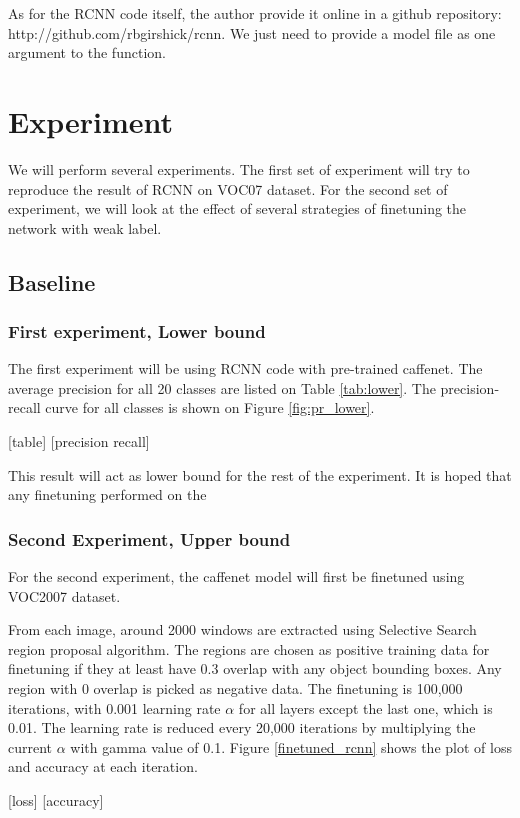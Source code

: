 \documentclass[a4paper,11pt]{kth-mag}
\begin{document}
As for the RCNN code itself, the author provide it online in a github repository: http://github.com/rbgirshick/rcnn. We just need to provide a model file as one argument to the function.

\section{Experiment}
We will perform several experiments. The first set of experiment will try to reproduce the result of RCNN on VOC07 dataset. For the second set of experiment, we will look at the effect of several strategies of finetuning the network with weak label.

\subsection{Baseline}
\subsubsection{First experiment, Lower bound}
The first experiment will be using RCNN code with pre-trained caffenet. The average precision for all 20 classes are listed on Table \ref{tab:lower}. The precision-recall curve for all classes is shown on Figure \ref{fig:pr_lower}.

[table]
[precision recall]

This result will act as lower bound for the rest of the experiment. It is hoped that any finetuning performed on the 

\subsubsection{Second Experiment, Upper bound}
For the second experiment, the caffenet model will first be finetuned using VOC2007 dataset.

From each image, around 2000 windows are extracted using Selective Search region proposal algorithm. The regions are chosen as positive training data for finetuning if they at least have 0.3 overlap with any object bounding boxes. Any region with 0 overlap is picked as negative data. The finetuning is 100,000 iterations, with 0.001 learning rate $\alpha$ for all layers except the last one, which is 0.01. The learning rate is reduced every 20,000 iterations by multiplying the current $\alpha$ with gamma value of 0.1. Figure \ref{finetuned_rcnn} shows the plot of loss and accuracy at each iteration.

[loss]
[accuracy]
\end{document}
